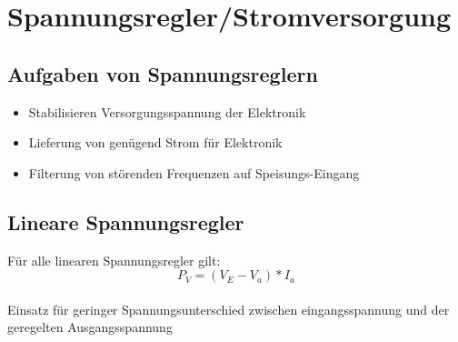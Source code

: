 \section{Spannungsregler/Stromversorgung} 
\subsection{Aufgaben von Spannungsreglern}
\begin{itemize}
  \item Stabilisieren Versorgungsspannung der Elektronik
  \item Lieferung von genügend Strom für Elektronik
  \item Filterung von störenden Frequenzen auf Speisungs-Eingang
\end{itemize}

\subsection{Lineare Spannungsregler} 
Für alle linearen Spannungsregler gilt: \begin{equation}
P_{V}=(V_{E}-V_{a})*I_{a}
\end{equation}\\
Einsatz für geringer Spannungsunterschied zwischen eingangsspannung und der
geregelten Ausgangsspannung

